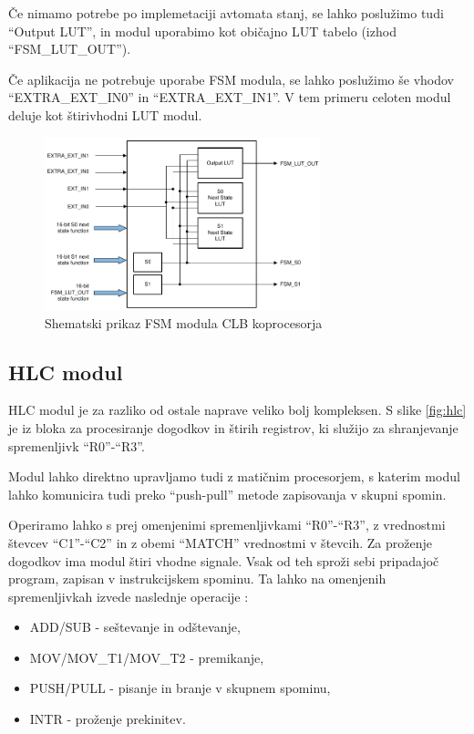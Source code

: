 \documentclass[a4paper]{article}
\begin{document}
\begin{sloppypar}
Če nimamo potrebe po implemetaciji avtomata stanj, se lahko poslužimo tudi
``Output LUT'', in modul uporabimo kot običajno LUT tabelo (izhod
``FSM\_LUT\_OUT'').

Če aplikacija ne potrebuje uporabe FSM modula, se lahko poslužimo še vhodov
``EXTRA\_EXT\_IN0'' in ``EXTRA\_EXT\_IN1''. V tem primeru celoten modul deluje
kot štirivhodni LUT modul.

\begin{figure}[htb]
    \centerline{\includegraphics[width=8cm]{shema_fsm}}
    \caption{Shematski prikaz FSM modula CLB koprocesorja
             \cite[Pogl.~26.4.3]{mcu-ref-manual}}
    \label{fig:fsm} 
\end{figure} 

\subsection{HLC modul}\label{sec:hlc}
HLC modul je za razliko od ostale naprave veliko bolj kompleksen. S slike
\ref{fig:hlc} je iz bloka za procesiranje dogodkov in štirih registrov, ki
služijo za shranjevanje spremenljivk
``R0''-``R3''\cite[Pogl.~26.4.6]{mcu-ref-manual}.

Modul lahko direktno upravljamo tudi z matičnim procesorjem, s katerim modul
lahko komunicira tudi preko ``push-pull'' metode zapisovanja v skupni spomin.

Operiramo lahko s prej omenjenimi spremenljivkami ``R0''-``R3'', z vrednostmi
števcev ``C1''-``C2'' in z obemi ``MATCH'' vrednostmi v števcih. Za proženje
dogodkov ima modul štiri vhodne signale. Vsak od teh sproži sebi pripadajoč
program, zapisan v instrukcijskem spominu. Ta lahko na omenjenih spremenljivkah
izvede naslednje operacije \cite[Pogl.~26.4.6.2]{mcu-ref-manual}:
\begin{itemize}
    \item ADD/SUB - seštevanje in odštevanje,
    \item MOV/MOV\_T1/MOV\_T2 - premikanje,
    \item PUSH/PULL - pisanje in branje v skupnem spominu,
    \item INTR - proženje prekinitev.
\end{itemize}


\end{sloppypar}
\end{document}
